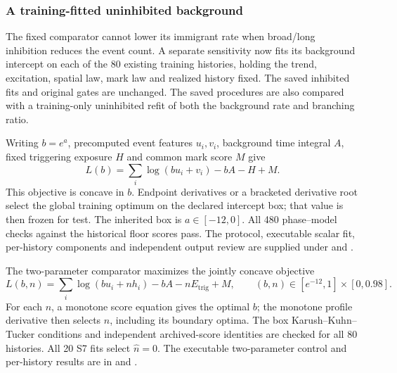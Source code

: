 \subsubsection{A training-fitted uninhibited background}\label{sec:s04b-refitted}
The fixed comparator cannot lower its immigrant rate when broad/long inhibition reduces the event count. A separate sensitivity now fits its background intercept on each of the 80 existing training histories, holding the trend, excitation, spatial law, mark law and realized history fixed. The saved inhibited fits and original gates are unchanged. The saved procedures are also compared with a training-only uninhibited refit of both the background rate and branching ratio.

Writing $b=e^a$, precomputed event features $u_i,v_i$, background time integral $A$, fixed triggering exposure $H$ and common mark score $M$ give
\[ L(b)=\sum_i\log(bu_i+v_i)-bA-H+M. \]
This objective is concave in $b$. Endpoint derivatives or a bracketed derivative root select the global training optimum on the declared intercept box; that value is then frozen for test. The inherited box is $a\in[-12,0]$. All 480 phase--model checks against the historical floor scores pass. The protocol, executable scalar fit, per-history components and independent output review are supplied under  and .

The two-parameter comparator maximizes the jointly concave objective
\[
L(b,n)=\sum_i\log(bu_i+nh_i)-bA-nE_{\mathrm{trig}}+M,
\qquad (b,n)\in[e^{-12},1]\times[0,0.98].
\]
For each $n$, a monotone score equation gives the optimal $b$; the monotone profile derivative then selects $n$, including its boundary optima. The box Karush--Kuhn--Tucker conditions and independent archived-score identities are checked for all 80 histories. All 20 S7 fits select $\hat n=0$. The executable two-parameter control and per-history results are in  and .

